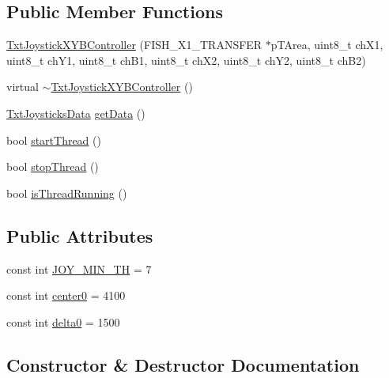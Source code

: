 \subsection*{Public Member Functions}
\begin{DoxyCompactItemize}
\item 
\hyperlink{classft_1_1_txt_joystick_x_y_b_controller_a90d6c8a0a5bb9ac3a91595089782810e}{Txt\+Joystick\+X\+Y\+B\+Controller} (F\+I\+S\+H\+\_\+\+X1\+\_\+\+T\+R\+A\+N\+S\+F\+ER $\ast$p\+T\+Area, uint8\+\_\+t ch\+X1, uint8\+\_\+t ch\+Y1, uint8\+\_\+t ch\+B1, uint8\+\_\+t ch\+X2, uint8\+\_\+t ch\+Y2, uint8\+\_\+t ch\+B2)
\item 
virtual \hyperlink{classft_1_1_txt_joystick_x_y_b_controller_af763355f59f61081a5095f4e2014a0a8}{$\sim$\+Txt\+Joystick\+X\+Y\+B\+Controller} ()
\item 
\hyperlink{classft_1_1_txt_joysticks_data}{Txt\+Joysticks\+Data} \hyperlink{classft_1_1_txt_joystick_x_y_b_controller_a962ddb7d0300ecddf0f2bc322bf72b26}{get\+Data} ()
\item 
bool \hyperlink{classft_1_1_txt_joystick_x_y_b_controller_aef881dfd58dcc8eead46bfcead9cdc7d}{start\+Thread} ()
\item 
bool \hyperlink{classft_1_1_txt_joystick_x_y_b_controller_afbba5442d5c9e558efc543b8c01117c1}{stop\+Thread} ()
\item 
bool \hyperlink{classft_1_1_txt_joystick_x_y_b_controller_ab56c6b61f902e08d32bdfa6d3efefc48}{is\+Thread\+Running} ()
\end{DoxyCompactItemize}
\subsection*{Public Attributes}
\begin{DoxyCompactItemize}
\item 
const int \hyperlink{classft_1_1_txt_joystick_x_y_b_controller_aed636918b23f3952bb7c7ee89d86f689}{J\+O\+Y\+\_\+\+M\+I\+N\+\_\+\+TH} = 7
\item 
const int \hyperlink{classft_1_1_txt_joystick_x_y_b_controller_a6332209742ebf5aff942f11daede67f2}{center0} = 4100
\item 
const int \hyperlink{classft_1_1_txt_joystick_x_y_b_controller_ab4a3b0a551b668871f516cf3d8ef0cc0}{delta0} = 1500
\end{DoxyCompactItemize}


\subsection{Constructor \& Destructor Documentation}
